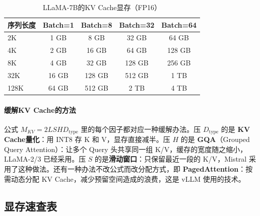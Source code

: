 \begin{table}[htbp]
\centering
\small
\renewcommand{\arraystretch}{1.3}
\begin{tabular}{l|c|c|c|c}
\toprule
\textbf{序列长度} & \textbf{Batch=1} & \textbf{Batch=8} & \textbf{Batch=32} & \textbf{Batch=64} \\
\midrule
2K & 1 GB & 8 GB & 32 GB & 64 GB \\
4K & 2 GB & 16 GB & 64 GB & 128 GB \\
8K & 4 GB & 32 GB & 128 GB & 256 GB \\
32K & 16 GB & 128 GB & 512 GB & 1 TB \\
128K & 64 GB & 512 GB & 2 TB & 4 TB \\
\bottomrule
\end{tabular}
\caption{LLaMA-7B的KV Cache显存（FP16）}
\end{table}

\paragraph{缓解KV Cache的方法}

公式 $M_{KV} = 2 L S H D_{\text{type}}$ 里的每个因子都对应一种缓解办法。压 $D_{\text{type}}$ 的是 \textbf{KV Cache量化}：用 INT8 存 K 和 V，显存直接减半。压 $H$ 的是 \textbf{GQA}（Grouped Query Attention）：让多个 Query 头共享同一组 K/V，缓存的宽度随之缩小，LLaMA-2/3 已经采用。压 $S$ 的是\textbf{滑动窗口}：只保留最近一段的 K/V，Mistral 采用了这种做法。还有一种办法不改公式而改分配方式，即 \textbf{PagedAttention}：按需动态分配 KV Cache，减少预留空间造成的浪费，这是 vLLM 使用的技术。

\subsection*{显存速查表}

